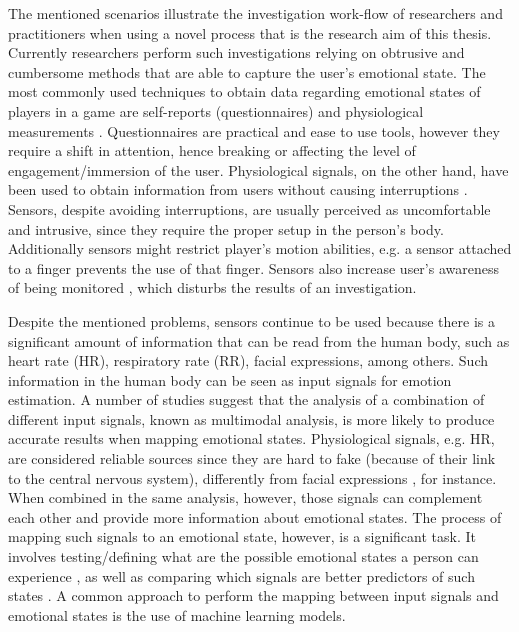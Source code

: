 The mentioned scenarios illustrate the investigation work-flow of researchers and practitioners when using a novel process that is the research aim of this thesis. Currently researchers perform such investigations relying on obtrusive and cumbersome methods that are able to capture the user's emotional state. The most commonly used techniques to obtain data regarding emotional states of players in a game are self-reports (questionnaires) and physiological measurements \parencite{mekler2014systematic}. Questionnaires are practical and ease to use tools, however they require a shift in attention, hence breaking or affecting the level of engagement/immersion of the user. Physiological signals, on the other hand, have been used to obtain information from users without causing interruptions \parencite{bousefsaf2013remote,yun2009game,rani2006empirical,tijs2008dynamic}. Sensors, despite avoiding interruptions, are usually perceived as uncomfortable and intrusive, since they require the proper setup in the person's body. Additionally sensors might restrict player's motion abilities, e.g. a sensor attached to a finger prevents the use of that finger. Sensors also increase user's awareness of being monitored \parencite{yamakoshi2007preliminary,yamaguchi2006evaluation,healey2005detecting}, which disturbs the results of an investigation.


Despite the mentioned problems, sensors continue to be used because there is a significant amount of information that can be read from the human body, such as heart rate (HR), respiratory rate (RR), facial expressions, among others. Such information in the human body can be seen as input signals for emotion estimation. A number of studies \parencite{kukolja2014comparative} suggest that the analysis of a combination of different input signals, known as multimodal analysis, is more likely to produce accurate results when mapping emotional states. Physiological signals, e.g. HR, are considered reliable sources since they are hard to fake (because of their link to the central nervous system), differently from facial expressions \parencite{Landowska}, for instance. When combined in the same analysis, however, those signals can complement each other and provide more information about emotional states. The process of mapping such signals to an emotional state, however, is a significant task. It involves testing/defining what are the possible emotional states a person can experience \parencite{mandryk2006continuous}, as well as comparing which signals are better predictors of such states \parencite{jerritta2011physiological}. A common approach to perform the mapping between input signals and emotional states is the use of machine learning models.

